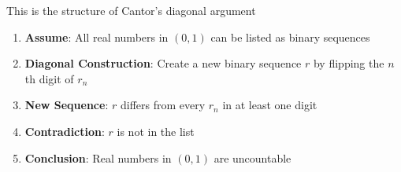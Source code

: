 This is the structure of Cantor’s diagonal argument
\begin{enumerate}
	\item \textbf{Assume}: All real numbers in $(0,1)$ can be listed as binary sequences
	\item \textbf{Diagonal Construction}: Create a new binary sequence $r$ by flipping the $n$th digit of $r_n$
	\item \textbf{New Sequence}:  $r$ differs from every $r_n$ in at least one digit
	\item \textbf{Contradiction}: $r$ is not in the list
	\item \textbf{Conclusion}: Real numbers in $(0,1)$ are uncountable
\end{enumerate}





